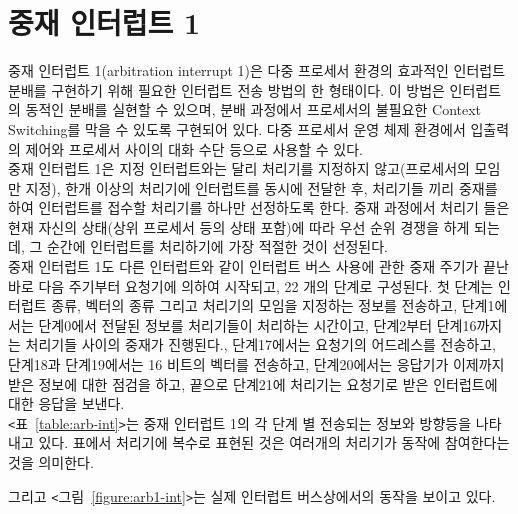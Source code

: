 \section{중재 인터럽트 1}
중재 인터럽트 1(arbitration interrupt 1)은 다중 프로세서 환경의 효과적인
인터럽트 분배를 구현하기 위해 필요한
인터럽트 전송 방법의 한 형태이다. 이 방법은 인터럽트의 동적인 분배를 실현할 수 있으며,
분배 과정에서 프로세서의 불필요한 Context Switching를 막을 수 있도록 구현되어 있다.
다중 프로세서 운영 체제 환경에서 입출력의 제어와 프로세서 사이의 대화 수단 등으로 사용할 수 있다. \\
중재 인터럽트 1은 지정 인터럽트와는 달리 처리기를 지정하지 않고(프로세서의 모임만 지정),
한개 이상의 처리기에 인터럽트를 동시에 전달한 후, 처리기들 끼리 중재를 하여
인터럽트를 접수할 처리기를 하나만 선정하도록 한다.
중재 과정에서 처리기 들은 현재 자신의 상태(상위 프로세서 등의 상태 포함)에 따라
우선 순위 경쟁을 하게 되는데, 그 순간에 인터럽트를 처리하기에 가장 적절한 것이 선정된다. \\
중재 인터럽트 1도 다른 인터럽트와 같이 인터럽트 버스 사용에 관한 중재 주기가 
끝난 바로 다음 주기부터 요청기에 의하여 시작되고, 22 개의 단계로 구성된다.
첫 단계는 인터럽트 종류, 벡터의 종류 그리고 처리기의 모임을 지정하는 정보를 전송하고,
단계1에서는 단계0에서 전달된 정보를 처리기들이 처리하는 시간이고,
단계2부터 단계16까지는 처리기들 사이의 중재가 진행된다.,
단계17에서는 요청기의 어드레스를 전송하고, 단계18과 단계19에서는 16 비트의
벡터를 전송하고, 단계20에서는 응답기가 이제까지 받은 정보에 대한 점검을 하고,
끝으로 단계21에 처리기는 요청기로 받은 인터럽트에 대한 응답을 보낸다. \\
{\tt <}표~\ref{table:arb-int}{\tt >}는 중재 인터럽트 1의
각 단계 별 전송되는 정보와 방향등을 나타내고 있다.
표에서 처리기에 복수로 표현된 것은 여러개의 처리기가 동작에 참여한다는 것을 의미한다.

그리고 {\tt <}그림~\ref{figure:arb1-int}{\tt >}는 실제
인터럽트 버스상에서의 동작을 보이고 있다.
%
